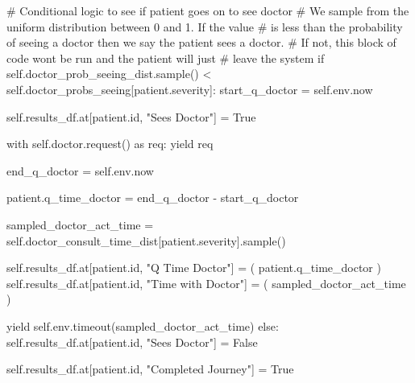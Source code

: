 \documentclass[
  letterpaper,
  DIV=11,
  numbers=noendperiod]{scrreprt}
\newenvironment{Shaded}{}{}
\newcommand{\BuiltInTok}[1]{\textcolor[rgb]{0.84,0.23,0.29}{#1}}
\newcommand{\CommentTok}[1]{\textcolor[rgb]{0.42,0.45,0.49}{#1}}
\newcommand{\ControlFlowTok}[1]{\textcolor[rgb]{0.84,0.23,0.29}{#1}}
\newcommand{\ImportTok}[1]{\textcolor[rgb]{0.01,0.18,0.38}{#1}}
\newcommand{\NormalTok}[1]{\textcolor[rgb]{0.14,0.16,0.18}{#1}}
\newcommand{\OperatorTok}[1]{\textcolor[rgb]{0.14,0.16,0.18}{#1}}
\newcommand{\StringTok}[1]{\textcolor[rgb]{0.01,0.18,0.38}{#1}}
\newcommand{\VariableTok}[1]{\textcolor[rgb]{0.89,0.38,0.04}{#1}}
\newcommand*\circled[1]{\tikz[baseline=(char.base)]{
          \node[shape=circle,draw,inner sep=1pt] (char) {{\scriptsize#1}};}}
\begin{document}
\label{annotated-cell-77}%
\begin{Shaded}
\begin{Highlighting}[]
        \CommentTok{\# Conditional logic to see if patient goes on to see doctor}
        \CommentTok{\# We sample from the uniform distribution between 0 and 1.  If the value}
        \CommentTok{\# is less than the probability of seeing a doctor then we say the patient sees a doctor.}
        \CommentTok{\# If not, this block of code won\textquotesingle{}t be run and the patient will just}
        \CommentTok{\# leave the system}
        \ControlFlowTok{if} \VariableTok{self}\NormalTok{.doctor\_prob\_seeing\_dist.sample() }\OperatorTok{\textless{}} \VariableTok{self}\NormalTok{.doctor\_probs\_seeing[patient.severity]: }\hspace*{\fill}\NormalTok{\circled{1}}
\NormalTok{            start\_q\_doctor }\OperatorTok{=} \VariableTok{self}\NormalTok{.env.now}

            \VariableTok{self}\NormalTok{.results\_df.at[patient.}\BuiltInTok{id}\NormalTok{, }\StringTok{"Sees Doctor"}\NormalTok{] }\OperatorTok{=} \VariableTok{True}

            \ControlFlowTok{with} \VariableTok{self}\NormalTok{.doctor.request() }\ImportTok{as}\NormalTok{ req:}
                \ControlFlowTok{yield}\NormalTok{ req}

\NormalTok{                end\_q\_doctor }\OperatorTok{=} \VariableTok{self}\NormalTok{.env.now}

\NormalTok{                patient.q\_time\_doctor }\OperatorTok{=}\NormalTok{ end\_q\_doctor }\OperatorTok{{-}}\NormalTok{ start\_q\_doctor}

\NormalTok{                sampled\_doctor\_act\_time }\OperatorTok{=} \VariableTok{self}\NormalTok{.doctor\_consult\_time\_dist[patient.severity].sample() }\hspace*{\fill}\NormalTok{\circled{2}}

                \VariableTok{self}\NormalTok{.results\_df.at[patient.}\BuiltInTok{id}\NormalTok{, }\StringTok{"Q Time Doctor"}\NormalTok{] }\OperatorTok{=}\NormalTok{ (}
\NormalTok{                    patient.q\_time\_doctor}
\NormalTok{                )}
                \VariableTok{self}\NormalTok{.results\_df.at[patient.}\BuiltInTok{id}\NormalTok{, }\StringTok{"Time with Doctor"}\NormalTok{] }\OperatorTok{=}\NormalTok{ (}
\NormalTok{                    sampled\_doctor\_act\_time}
\NormalTok{                )}

                \ControlFlowTok{yield} \VariableTok{self}\NormalTok{.env.timeout(sampled\_doctor\_act\_time)}
        \ControlFlowTok{else}\NormalTok{:}
            \VariableTok{self}\NormalTok{.results\_df.at[patient.}\BuiltInTok{id}\NormalTok{, }\StringTok{"Sees Doctor"}\NormalTok{] }\OperatorTok{=} \VariableTok{False}

        \VariableTok{self}\NormalTok{.results\_df.at[patient.}\BuiltInTok{id}\NormalTok{, }\StringTok{"Completed Journey"}\NormalTok{] }\OperatorTok{=} \VariableTok{True}
\end{Highlighting}
\end{Shaded}
\end{document}
